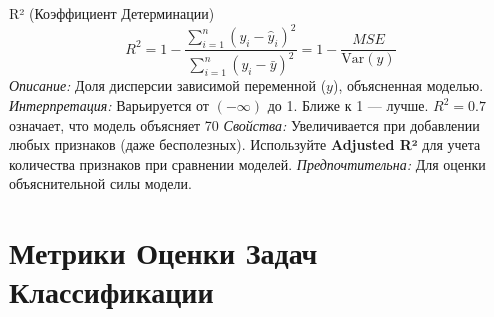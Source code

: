 \begin{textbox}{{R² (Коэффициент Детерминации)}}
    \[ R^2 = 1 - \frac{\sum_{i=1}^{n} (y_i - \hat{y}_i)^2}{\sum_{i=1}^{n} (y_i - \bar{y})^2} = 1 - \frac{MSE}{\text{Var}(y)} \]
    \textit{Описание:} Доля дисперсии зависимой переменной ($y$), объясненная моделью.
    \textit{Интерпретация:} Варьируется от $(-\infty)$ до 1. Ближе к 1 — лучше. $R^2=0.7$ означает, что модель объясняет 70%
    \textit{Свойства:} Увеличивается при добавлении любых признаков (даже бесполезных). Используйте \textbf{Adjusted R²} для учета количества признаков при сравнении моделей.
    \textit{Предпочтительна:} Для оценки объяснительной силы модели.
\end{textbox}

\section{Метрики Оценки Задач Классификации}

